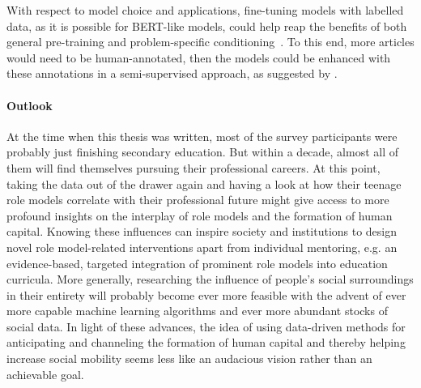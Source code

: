 With respect to model choice and applications, fine-tuning models with labelled data, as it is possible for BERT-like models, could help reap the benefits of both general pre-training and problem-specific conditioning~\autocite{devlin_bert_2019}. To this end, more articles would need to be human-annotated, then the models could be enhanced with these annotations in a semi-supervised approach, as suggested by \textcite{fenske_using_2022}.


\paragraph{Outlook}
At the time when this thesis was written, most of the survey participants were probably just finishing secondary education. But within a decade, almost all of them will find themselves pursuing their professional careers. At this point, taking the data out of the drawer again and having a look at how their teenage role models correlate with their professional future might give access to more profound insights on the interplay of role models and the formation of human capital. Knowing these influences can inspire society and institutions to design novel role model-related interventions apart from individual mentoring, e.g. an evidence-based, targeted integration of prominent role models into education curricula. More generally, researching the influence of people's social surroundings in their entirety will probably become ever more feasible with the advent of ever more capable machine learning algorithms and ever more abundant stocks of social data. In light of these advances, the idea of using data-driven methods for anticipating and channeling the formation of human capital and thereby helping increase social mobility seems less like an audacious vision rather than an achievable goal.